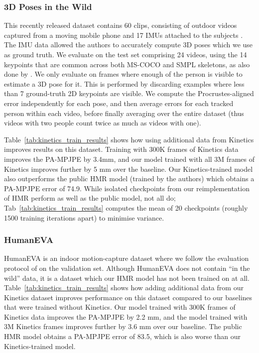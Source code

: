 \documentclass[10pt,twocolumn,letterpaper]{article}
\begin{document}
\subsubsection{3D Poses in the Wild}
\label{sec:exp_3dpw}

This recently released dataset contains 60 clips, consisting of outdoor videos captured from a moving mobile phone and 17 IMUs attached to the subjects \cite{von_marcard_eccv_2018}.
The IMU data allowed the authors to accurately compute 3D poses which we use as ground truth.
We evaluate on the test set comprising 24 videos, using the 14 keypoints that are common across both MS-COCO and SMPL skeletons, as also done by \cite{kanazawa_cvpr_2019}.
We only evaluate on frames where enough of the person is visible to estimate a 3D pose for it.
This is performed by discarding examples where less than 7 ground-truth 2D keypoints are visible.
We compute the Procrustes-aligned error independently for each pose, and then average errors for each tracked person within each video, before finally averaging over the entire dataset (thus videos with two people count twice as much as videos with one).

Table~\ref{tab:kinetics_train_results} shows how using additional data from Kinetics improves results on this dataset.
Training with 300K frames of Kinetics data improves the PA-MPJPE by 3.4mm, and our model trained with all 3M frames of Kinetics improves further by 5 mm over the baseline.
Our Kinetics-trained model also outperforms the public HMR model \cite{kanazawa_cvpr_2018} (trained by the authors) which obtains a PA-MPJPE error of 74.9.
While isolated checkpoints from our reimplementation of HMR perform as well as the public model, not all do; Tab~\ref{tab:kinetics_train_results} computes the mean of 20 checkpoints (roughly 1500 training iterations apart) to minimise variance.

\subsubsection{HumanEVA}
\label{sec:exp_humaneva}

HumanEVA \cite{sigal_ijcv_2010} is an indoor motion-capture dataset where we follow the evaluation protocol of \cite{bogo_eccv_2016} on the validation set.
Although HumanEVA does not contain ``in the wild'' data, it is a dataset which our HMR model has not been trained on at all.
Table~\ref{tab:kinetics_train_results} shows how adding additional data from our Kinetics dataset improves performance on this dataset compared to our baselines that were trained without Kinetics.
Our model trained with 300K frames of Kinetics data improves the PA-MPJPE by 2.2 mm, and the model trained with 3M Kinetics frames improves further by 3.6 mm over our baseline.
The public HMR model obtains a PA-MPJPE error of 83.5, which is also worse than our Kinetics-trained model.
\end{document}
